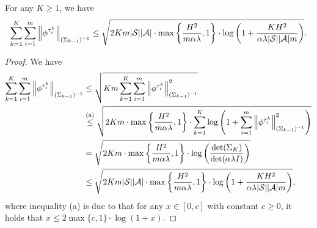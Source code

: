 \begin{lemma} \label{lemma:sum_phi_seg_binary}
	For any $K\geq 1$, we have
	\begin{align*}
		\sum_{k=1}^{K} \sum_{i=1}^{m} \left\|  \phi^{\tau^k_i} \right\|_{(\Sigma_{k-1})^{-1}} \leq \sqrt{ 2Km |\mathcal{S}| |\mathcal{A}| \cdot \max\left\{  \frac{H^2}{m \alpha \lambda}, 1 \right\} \cdot \log \left(  1+ \frac{  KH^2 }{ \alpha \lambda |\mathcal{S}| |\mathcal{A}| m }  \right) } .
	\end{align*}
\end{lemma}
\begin{proof}		
	We have
	\begin{align}
		\sum_{k=1}^{K} \sum_{i=1}^{m} \left\|  \phi^{\tau^k_i} \right\|_{(\Sigma_{k-1})^{-1}} &\leq \sqrt{ Km   \sum_{k=1}^{K} \sum_{i=1}^{m} \left\|  \phi^{\tau^k_i} \right\|_{(\Sigma_{k-1})^{-1}}^2 }
		\nonumber\\
		&\overset{\textup{(a)}}{\leq} \sqrt{ 2Km \cdot \max\left\{  \frac{H^2}{m \alpha \lambda}, 1 \right\} \cdot \sum_{k=1}^{K} \log \left(  1+ \sum_{i=1}^{m} \left\|  \phi^{\tau^k_i} \right\|_{(\Sigma_{k-1})^{-1}}^2 \right) }
		\nonumber\\ 
		&= \sqrt{ 2Km \cdot \max\left\{  \frac{H^2}{m \alpha \lambda}, 1 \right\} \cdot \log \left(  \frac{\det(\Sigma_K)}{\det(\alpha \lambda I)}  \right) } 
		\nonumber\\
		&\leq \sqrt{ 2Km |\mathcal{S}| |\mathcal{A}| \cdot \max\left\{  \frac{H^2}{m \alpha \lambda}, 1 \right\} \cdot \log \left(  1+ \frac{  KH^2 }{ \alpha \lambda |\mathcal{S}| |\mathcal{A}| m }  \right) } , \label{eq:sum_indicator_derivation}
	\end{align}
	where inequality (a) is due to that for any $x \in [0,c]$ with constant $c\geq0$, it holds that $x \leq 2 \max\{c,1\} \cdot \log(1+x)$.
\end{proof}


